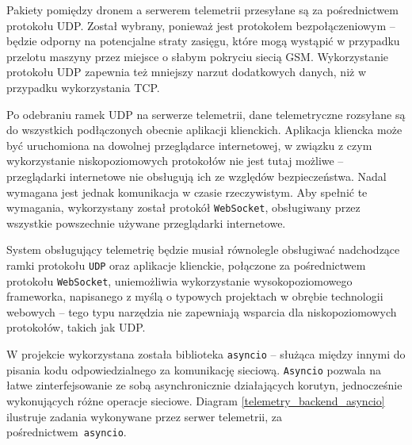 Pakiety pomiędzy dronem a serwerem telemetrii przesyłane są za pośrednictwem protokołu
UDP. Został wybrany, ponieważ jest protokołem bezpołączeniowym -- będzie odporny na
potencjalne straty zasięgu, które mogą wystąpić w przypadku
przelotu maszyny przez miejsce o słabym pokryciu siecią GSM. Wykorzystanie protokołu
UDP zapewnia też mniejszy narzut dodatkowych danych, niż w przypadku wykorzystania
TCP.

Po odebraniu ramek UDP na serwerze telemetrii, dane telemetryczne rozsyłane są do
wszystkich podłączonych obecnie aplikacji klienckich. Aplikacja kliencka może
być uruchomiona na dowolnej przeglądarce internetowej, w związku z czym wykorzystanie
niskopoziomowych protokołów nie jest tutaj możliwe -- przeglądarki internetowe nie 
obsługują ich ze względów bezpieczeństwa. Nadal wymagana jest jednak komunikacja
w czasie rzeczywistym. 
Aby spełnić te wymagania, wykorzystany został protokół \texttt{WebSocket}\cite{websocket},
obsługiwany przez wszystkie powszechnie używane przeglądarki internetowe.

System obsługujący telemetrię będzie musiał równolegle obsługiwać nadchodzące
ramki protokołu \texttt{UDP} oraz aplikacje klienckie, połączone za pośrednictwem protokołu 
\texttt{WebSocket}, uniemożliwia wykorzystanie wysokopoziomowego frameworka,
napisanego z myślą o typowych projektach w obrębie technologii webowych --
tego typu narzędzia nie zapewniają wsparcia dla niskopoziomowych protokołów,
takich jak UDP.

W projekcie wykorzystana została biblioteka \texttt{asyncio} -- służąca między innymi
do pisania kodu odpowiedzialnego za komunikację sieciową\cite{asyncio}.
\texttt{Asyncio} pozwala na łatwe zinterfejsowanie ze sobą asynchronicznie działających
korutyn, jednocześnie wykonujących różne operacje sieciowe. Diagram \ref{telemetry_backend_asyncio}
ilustruje zadania wykonywane przez serwer telemetrii, za pośrednictwem~\texttt{asyncio}. 

